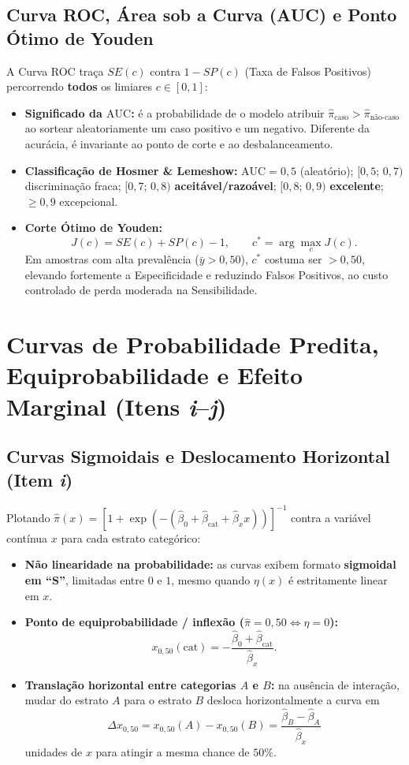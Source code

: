 \documentclass[11pt,a4paper]{article}
\begin{document}
\subsection{Curva ROC, Área sob a Curva (AUC) e Ponto Ótimo de Youden}
A Curva ROC traça $SE(c)$ contra $1 - SP(c)$ (Taxa de Falsos Positivos) percorrendo \textbf{todos} os limiares $c \in [0, 1]$:
\begin{itemize}[leftmargin=1.4em]
  \item \textbf{Significado da $\text{AUC}$:} é a probabilidade de o modelo atribuir $\hat{\pi}_{\text{caso}} > \hat{\pi}_{\text{não-caso}}$ ao sortear aleatoriamente um caso positivo e um negativo. Diferente da acurácia, é invariante ao ponto de corte e ao desbalanceamento.
  \item \textbf{Classificação de Hosmer \& Lemeshow:} $\text{AUC}=0{,}5$ (aleatório); $[0{,}5;\,0{,}7)$ discriminação fraca; $[0{,}7;\,0{,}8)$ \textbf{aceitável/razoável}; $[0{,}8;\,0{,}9)$ \textbf{excelente}; $\ge 0{,}9$ excepcional.
  \item \textbf{Corte Ótimo de Youden:}
  \[
    J(c) = SE(c) + SP(c) - 1, \qquad c^* = \arg\max_{c} J(c).
  \]
  Em amostras com alta prevalência ($\bar{y} > 0{,}50$), $c^*$ costuma ser $> 0{,}50$, elevando fortemente a Especificidade e reduzindo Falsos Positivos, ao custo controlado de perda moderada na Sensibilidade.
\end{itemize}

\section{Curvas de Probabilidade Predita, Equiprobabilidade e Efeito Marginal (Itens \textit{i}--\textit{j})}

\subsection{Curvas Sigmoidais e Deslocamento Horizontal (Item \textit{i})}
Plotando $\hat{\pi}(x) = [1 + \exp(-(\hat{\beta}_0 + \hat{\beta}_{\text{cat}} + \hat{\beta}_x x))]^{-1}$ contra a variável contínua $x$ para cada estrato categórico:
\begin{itemize}[leftmargin=1.4em]
  \item \textbf{Não linearidade na probabilidade:} as curvas exibem formato \textbf{sigmoidal em ``S''}, limitadas entre $0$ e $1$, mesmo quando $\eta(x)$ é estritamente linear em $x$.
  \item \textbf{Ponto de equiprobabilidade / inflexão ($\hat{\pi} = 0{,}50 \iff \hat{\eta} = 0$):}
  \[
    x_{0{,}50}(\text{cat}) = -\frac{\hat{\beta}_0 + \hat{\beta}_{\text{cat}}}{\hat{\beta}_x}.
  \]
  \item \textbf{Translação horizontal entre categorias $A$ e $B$:} na ausência de interação, mudar do estrato $A$ para o estrato $B$ desloca horizontalmente a curva em
  \[
    \Delta x_{0{,}50} = x_{0{,}50}(A) - x_{0{,}50}(B) = \frac{\hat{\beta}_B - \hat{\beta}_A}{\hat{\beta}_x}
  \]
  unidades de $x$ para atingir a mesma chance de $50\%$.
\end{itemize}
\end{document}

